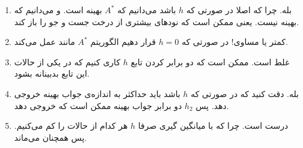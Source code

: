 \begin{enumerate}
    \item بله. چرا که اصلا در صورتی که $h$  باشد می‌دانیم که $A^*$ بهینه است. و می‌دانیم که  بهینه نیست.
    یعنی ممکن است که  نود‌های بیشتری از درخت جست و جو را باز کند.
    \item کمتر یا مساوی! در صورتی که $h = 0$ قرار دهیم الگوریتم $A^*$ مانند  عمل می‌کند.
    \item غلط است. ممکن است که دو برابر کردن تابع $h$ کاری کنیم که در یکی از حالات این تابع بدبینانه بشود.
    \item بله. دقت کنید که در صورتی که $h$  باشد باید حداکثر به اندازه‌ی جواب بهینه خروجی دهد. پس $h_2$ دو برابر جواب بهینه ممکن است که خروجی دهد.
    \item درست است. چرا که با میانگین گیری صرفا $h$ هر کدام از حالات را کم می‌کنیم. پس همچنان
    می‌ماند.
\end{enumerate}